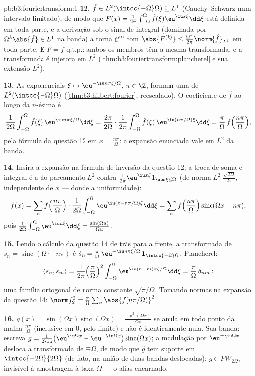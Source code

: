 \begin{solution}{pb:b3:fouriertransform:1}
\textbf{12.} $\hat f \in L^2(\intcc{-\Omega}\Omega)
\subseteq L^1$ (Cauchy--Schwarz num intervalo limitado), de modo que
$F(x) = \frac1{2\pi}\int_{-\Omega}^\Omega\hat
f(\xi)\eu^{\iu x\xi}\dd\xi$ está definida em toda parte, e a
derivação sob o sinal de integral (dominada por
$\Omega^k\abs{\hat f} \in L^1$ na banda) a torna
$\mathcal C^\infty$ com $\abs{F^{(k)}} \leq
\frac{\Omega^k}{2\pi}\norm{\hat f}_{L^1}$ em toda parte. E $F
= f$ q.t.p.: ambos os membros têm a mesma transformada, e a
transformada é injetora em $L^2$
(\cref{thm:b3:fouriertransform:plancherel} e sua extensão
$L^2$).

\textbf{13.} As exponenciais $\xi \mapsto \eu^{-\iu
n\pi\xi/\Omega}$, $n \in \Z$, formam uma  de
$L^2(\intcc{-\Omega}\Omega)$
(\cref{thm:b3:hilbert:fourier}, reescalado). O coeficiente
de $\hat f$ ao longo da $n$-ésima é
\[
\frac1{2\Omega}\int_{-\Omega}^\Omega\hat f(\xi)\,
\eu^{\iu n\pi\xi/\Omega}\dd\xi
= \frac{2\pi}{2\Omega}\cdot
\frac1{2\pi}\int_{-\Omega}^{\Omega}\hat f(\xi)\,
\eu^{\iu(n\pi/\Omega)\xi}\dd\xi
= \frac\pi\Omega\,f\Bigl(\frac{n\pi}\Omega\Bigr),
\]
pela fórmula da questão 12 em $x = \frac{n\pi}\Omega$: a
expansão enunciada vale em $L^2$ da banda.

\textbf{14.} Insira a expansão na fórmula de inversão
da questão 12; a troca de soma e integral é a
 do pareamento $L^2$ contra $\frac1{2\pi}
\eu^{\iu x\xi}\mathbf 1_{\abs\xi\leq\Omega}$ (de norma $L^2$
$\frac{\sqrt{2\Omega}}{2\pi}$, independente de $x$ ---
donde a uniformidade):
\[
f(x) = \sum_nf\Bigl(\frac{n\pi}\Omega\Bigr)\cdot
\frac1{2\Omega}\int_{-\Omega}^\Omega
\eu^{\iu(x - n\pi/\Omega)\xi}\dd\xi
= \sum_nf\Bigl(\frac{n\pi}\Omega\Bigr)
\operatorname{sinc}(\Omega x - n\pi),
\]
pois $\frac1{2\Omega}\int_{-\Omega}^\Omega\eu^{\iu
u\xi}\dd\xi = \frac{\sin(\Omega u)}{\Omega u}$.

\textbf{15.} Lendo o cálculo da questão 14 de trás para a frente,
a transformada de $s_n = \operatorname{sinc}(\Omega\cdot -
n\pi)$ é $\hat s_n = \frac\pi\Omega\,\eu^{-\iu
n\pi\xi/\Omega}\,\mathbf 1_{\intcc{-\Omega}\Omega}$.
Plancherel:
\[
\langle s_n, s_m\rangle = \frac1{2\pi}
\Bigl(\frac\pi\Omega\Bigr)^2\int_{-\Omega}^\Omega
\eu^{\iu(n-m)\pi\xi/\Omega}\dd\xi =
\frac\pi\Omega\,\delta_{nm} :
\]
uma família ortogonal de norma constante
$\sqrt{\pi/\Omega}$. Tomando normas na expansão da questão 14:
$\norm f_2^2 =
\frac\pi\Omega\sum_n\abs{f(n\pi/\Omega)}^2$.

\textbf{16.} $g(x) = \sin(\Omega x)\operatorname{sinc}
(\Omega x) = \frac{\sin^2(\Omega x)}{\Omega x}$ se anula em
todo ponto da malha $\frac{n\pi}\Omega$ (inclusive em $0$, pelo
limite) e não é identicamente nula. Sua banda: escreva $g =
\frac1{2\iu}\bigl(\eu^{\iu\Omega x} - \eu^{-\iu\Omega
x}\bigr)\operatorname{sinc}(\Omega x)$; a modulação por
$\eu^{\pm\iu\Omega x}$ desloca a transformada de
$\mp\Omega$, de modo que $\hat g$ tem suporte em
$\intcc{-2\Omega}{2\Omega}$ (de fato, na união de duas
bandas deslocadas): $g \in PW_{2\Omega}$, invisível à
amostragem à taxa $\Omega$ --- o alias encarnado.


\end{solution}
